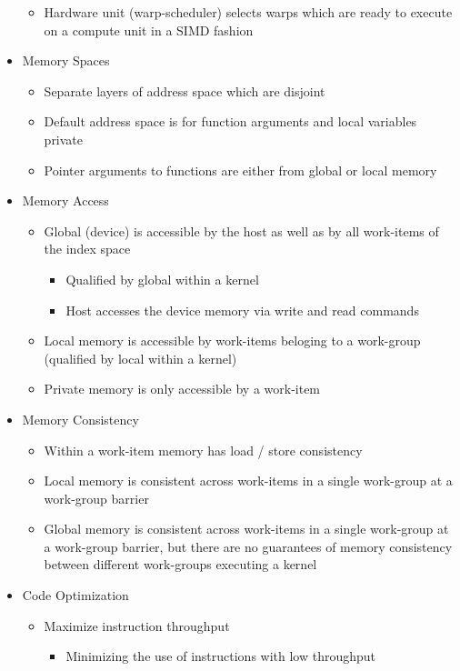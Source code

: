 \documentclass[paper=a4, fontsize=11pt]{scrartcl} %
\numberwithin{equation}{section} %
\numberwithin{figure}{section} %
\numberwithin{table}{section} %
\begin{document}
\begin{itemize}
\begin{itemize}
    \item Hardware unit (warp-scheduler) selects warps which are ready to execute on a compute unit in a SIMD fashion
  \end{itemize}
  \item Memory Spaces
  \begin{itemize}
    \item Separate layers of address space which are disjoint
    \item Default address space is for function arguments and local variables private
    \item Pointer arguments to functions are either from global or local memory
  \end{itemize}
  \item Memory Access
  \begin{itemize}
    \item Global (device) is accessible by the host as well as by all work-items of the index space
    \begin{itemize}
      \item Qualified by global within a kernel
      \item Host accesses the device memory via write and read commands
    \end{itemize}
    \item Local memory is accessible by work-items beloging to a work-group (qualified by local within a kernel)
    \item Private memory is only accessible by a work-item
  \end{itemize}
  \item Memory Consistency
  \begin{itemize}
    \item Within a work-item memory has load / store consistency
    \item Local memory is consistent across work-items in a single work-group at a work-group barrier
    \item Global memory is consistent across work-items in a single work-group at a work-group barrier, but there are no guarantees of memory consistency between different work-groups executing a kernel
  \end{itemize}
  \item Code Optimization
  \begin{itemize}
    \item Maximize instruction throughput
    \begin{itemize}
      \item Minimizing the use of instructions with low throughput

\end{itemize}
\end{itemize}
\end{itemize}
\end{document}
